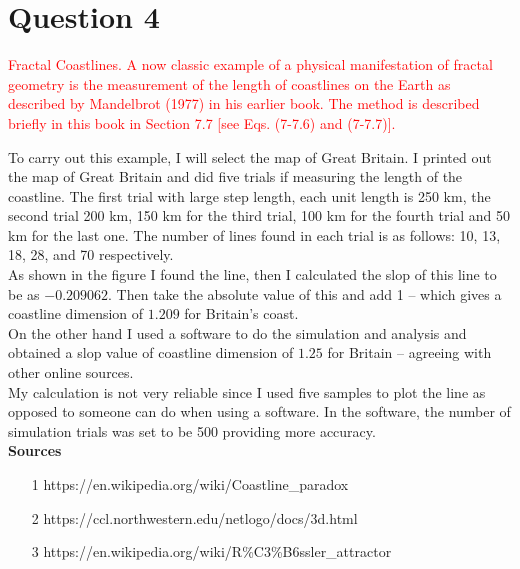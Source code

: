 \documentclass[12pt]{article}
\begin{document}
\section{Question 4}
\textcolor{red}{Fractal Coastlines. A now classic example of a physical manifestation of fractal geometry is the measurement of the length of coastlines on the Earth as described by Mandelbrot (1977) in his earlier book. The method is described briefly in this book in Section 7.7 [see Eqs. (7-7.6) and (7-7.7)].}\\

\vspace{0.2 in}

To carry out this example, I will select the map of Great Britain. I printed out the map of Great Britain and did five trials if measuring the length of the coastline. The first trial with large step length, each unit length is 250 km, the second trial 200 km, 150 km for the third trial, 100 km for the fourth trial and 50 km for the last one. The number of lines found in each trial is as follows: 10, 13, 18, 28, and 70 respectively. \\

As shown in the figure I found the line, then I calculated the slop of this line to be as $-0.209062$. Then take the absolute value of this and add 1 – which gives a coastline dimension of $1.209$ for Britain's coast. \\



On the other hand I used a software to do the simulation and analysis and obtained a slop value of coastline dimension of $1.25$ for Britain – agreeing with other online sources.\\

My calculation is not very reliable since I used five samples to plot the line as opposed to someone can do when using a software. In the software, the number of simulation trials was set to be 500 providing more accuracy. \\






{\Large{\textbf{Sources}}}\\
\begin{enumerate}
\item[1] https://en.wikipedia.org/wiki/Coastline_paradox
\item[2] https://ccl.northwestern.edu/netlogo/docs/3d.html
\item[3] https://en.wikipedia.org/wiki/R\%C3\%B6ssler_attractor
\end{enumerate}




\vspace{0.5 in}
\end{document}
